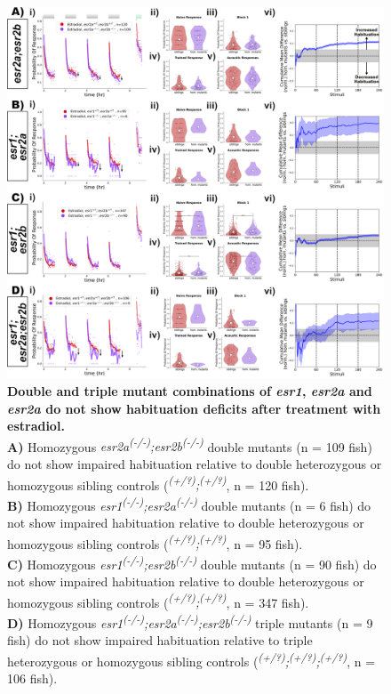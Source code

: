 \documentclass[9pt,lineno]{RandlettLab_elife}
\begin{document}
{\begin{figure}
\begin{fullwidth}
\begin{center}
\includegraphics[width=0.8\linewidth]{figures/NuclearDoubleAndTripleMutants.png}
\caption{ \textbf{Double and triple mutant combinations of \emph{esr1}, \emph{esr2a} and \emph{esr2a} do not show habituation deficits after treatment with estradiol.} \scriptsize
\\ \textbf{A)} Homozygous \emph{esr2a\textsuperscript{(-/-)};esr2b\textsuperscript{(-/-)}} double mutants (n = 109 fish) do not show impaired habituation relative to double heterozygous or homozygous sibling controls (\emph{\textsuperscript{(+/?)};\textsuperscript{(+/?)}}, n = 120 fish). 
\\ \textbf{B)} Homozygous \emph{esr1\textsuperscript{(-/-)};esr2a\textsuperscript{(-/-)}} double mutants (n = 6 fish) do not show impaired habituation relative to double heterozygous or homozygous sibling controls (\emph{\textsuperscript{(+/?)};\textsuperscript{(+/?)}}, n = 95 fish). 
\\ \textbf{C)} Homozygous \emph{esr1\textsuperscript{(-/-)};esr2b\textsuperscript{(-/-)}} double mutants (n = 90 fish) do not show impaired habituation relative to double heterozygous or homozygous sibling controls (\emph{\textsuperscript{(+/?)};\textsuperscript{(+/?)}}, n = 347 fish). 
\\ \textbf{D)} Homozygous \emph{esr1\textsuperscript{(-/-)};esr2a\textsuperscript{(-/-)};esr2b\textsuperscript{(-/-)}} triple mutants (n = 9 fish) do not show impaired habituation relative to triple heterozygous or homozygous sibling controls (\emph{\textsuperscript{(+/?)};\textsuperscript{(+/?)};\textsuperscript{(+/?)}}, n = 106 fish). 
}
\end{center}
\end{fullwidth}
\end{figure}}
\end{document}

